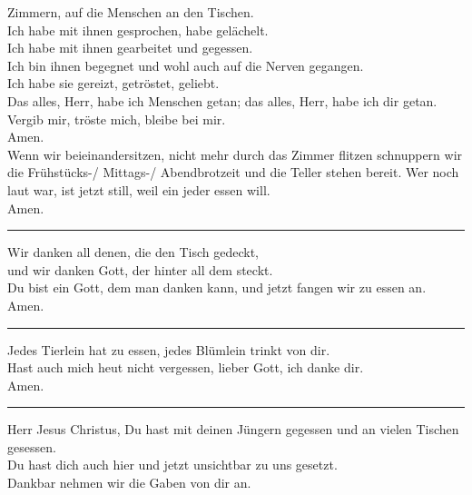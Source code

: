 Zimmern, auf die Menschen an den Tischen.\\
Ich habe mit ihnen gesprochen, habe gelächelt.\\
Ich habe mit ihnen gearbeitet und gegessen. \\
Ich bin ihnen begegnet und wohl auch auf die Nerven gegangen.\\
Ich habe sie gereizt, getröstet, geliebt. \\
Das alles, Herr, habe ich Menschen getan; das alles, Herr, habe ich dir getan. \\
Vergib mir, tröste mich, bleibe bei mir.\\ \newline
Amen.\\
Wenn  wir  beieinandersitzen,  nicht  mehr  durch  das  Zimmer  flitzen  schnuppern  wir  die Frühstücks-/ Mittags-/ Abendbrotzeit und die Teller stehen bereit. Wer noch laut war, ist jetzt still, weil ein jeder essen will.\\ \newline
Amen.\\
\par\noindent\rule{\textwidth}{0.4pt} \newline \newline
Wir danken all denen, die den Tisch gedeckt, \\
und wir danken Gott, der hinter all dem steckt.\\
Du bist ein Gott, dem man danken kann, und jetzt fangen wir zu essen an.\\ \newline
Amen.\\
\par\noindent\rule{\textwidth}{0.4pt} \newline \newline
Jedes Tierlein hat zu essen, jedes Blümlein trinkt von dir.\\
 Hast auch mich heut nicht vergessen, lieber Gott, ich danke dir.\\ \newline
Amen.\\
\par\noindent\rule{\textwidth}{0.4pt} \newline \newline
Herr Jesus Christus, Du hast mit deinen Jüngern gegessen und an vielen Tischen gesessen. \\
Du hast dich auch hier und jetzt unsichtbar zu uns gesetzt.\\
Dankbar nehmen wir die Gaben von dir an.\\
